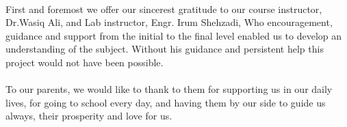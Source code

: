 


\begin{titlepage}
\begin{center}
 \\
\end{center}
  \vspace*{0.5cm}

\noindent First and foremost we offer our sincerest gratitude to our course instructor,  Dr.Wasiq Ali, and Lab instructor, Engr. Irum Shehzadi, Who encouragement, guidance and support from the initial to the final level enabled us to develop an understanding of the subject. Without his guidance and persistent help this project would not have been possible.\\\\
To our parents, we would like to thank to them for supporting us in our daily lives, for going to school every day, and having them by our side to guide us always, their prosperity and love for us.
\end{titlepage}


